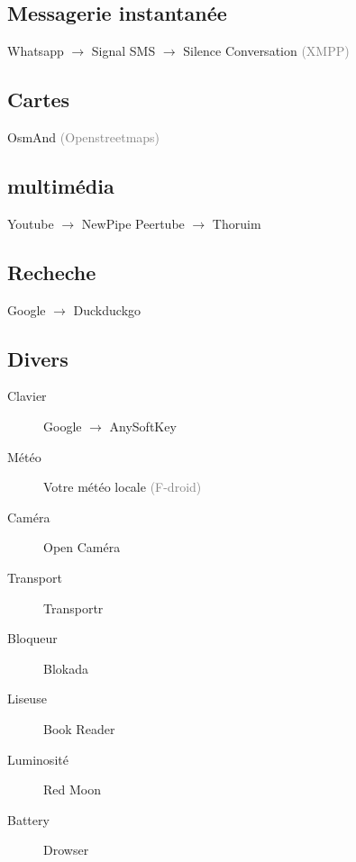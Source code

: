 \documentclass[aspectratio=169]{beamer}
\begin{document}
\subsection{Messagerie instantanée}
\begin{frame}
Whatsapp $\to$ Signal\newline
SMS $\to$ Silence\newline
Conversation \textcolor{gray}{\tiny{(XMPP)}}
\end{frame}

\subsection{Cartes}
\begin{frame}
OsmAnd \textcolor{gray}{\tiny{(Openstreetmaps)}}
\end{frame}

\subsection{multimédia}
\begin{frame}
Youtube $\to$ NewPipe\newline
Peertube $\to$ Thoruim
\end{frame}

\subsection{Recheche}
\begin{frame}
Google $\to$ Duckduckgo
\end{frame}

\subsection{Divers}
\begin{frame}
\begin{description}
	\item[Clavier] Google $\to$ AnySoftKey
	\item[Météo] Votre météo locale \textcolor{gray}{\tiny{(F-droid)}}
	\item[Caméra] Open Caméra
	\item[Transport] Transportr
	\item[Bloqueur] Blokada
	\item[Liseuse] Book Reader
	\item[Luminosité] Red Moon
	\item[Battery] Drowser
\end{description}
\end{frame}
\end{document}
